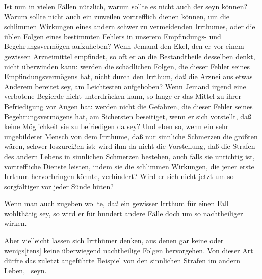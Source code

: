 \begin{aufza}
\item Ist nun  in vielen Fällen nützlich, warum sollte es nicht auch der  seyn können? Warum sollte nicht auch ein  zuweilen vortrefflich dienen können, um die schlimmen Wirkungen eines andern schwer zu vermeidenden Irrthumes, oder die üblen Folgen eines bestimmten Fehlers in unserem Empfindungs- und Begehrungsvermögen aufzuheben? Wenn Jemand den Ekel, den er vor einem gewissen Arzneimittel empfindet, so oft er an die Bestandtheile desselben denkt, nicht überwinden kann: werden die schädlichen Folgen, die dieser Fehler seines Empfindungsvermögens hat, nicht durch den Irrthum, daß die Arznei aus etwas Anderem bereitet sey, am Leichtesten aufgehoben? Wenn Jemand irgend eine verbotene Begierde nicht unterdrücken kann, so lange er das Mittel zu ihrer Befriedigung vor Augen hat: werden nicht die Gefahren, die dieser Fehler seines Begehrungsvermögens hat, am Sichersten beseitiget, wenn er sich vorstellt, daß keine Möglichkeit sie zu befriedigen da sey? Und eben so, wenn ein sehr ungebildeter Mensch von dem Irrthume, daß nur sinnliche Schmerzen die größten wären, schwer loszureißen ist: wird ihm da nicht die Vorstellung, daß die Strafen des andern Lebens in sinnlichen Schmerzen bestehen, auch falls sie unrichtig ist, vortreffliche Dienste leisten, indem sie die schlimmen Wirkungen, die jener erste Irrthum hervorbringen könnte, verhindert? Wird er sich nicht jetzt um so sorgfältiger vor jeder Sünde hüten?
\end{aufza}\par
{} Wenn man auch zugeben wollte, daß ein gewisser Irrthum für einen  Fall wohlthätig sey, so wird er für hundert andere Fälle doch um so nachtheiliger wirken.\par
{} Aber vielleicht lassen sich Irrthümer denken, aus denen gar keine oder wenigs[tens] keine überwiegend nachtheilige Folgen hervorgehen. Von dieser Art dürfte das zuletzt angeführte Beispiel von den sinnlichen Strafen im andern Leben, \uma\ seyn.~


